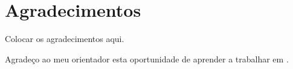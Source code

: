 


% 
% 
% 

\begingroup
\let\clearpage\relax
\let\cleardoublepage\relax
\let\cleardoublepage\relax
\chapter*{Agradecimentos}
Colocar os  agradecimentos aqui.

Agradeço ao meu orientador esta oportunidade de aprender a trabalhar em \LaTeXe.


\endgroup



